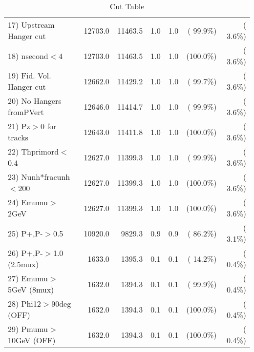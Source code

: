 \begin{table}[h!]
\begin{tabular}{||l||r|r|r|r|r|r||}
 17) Upstream Hanger cut  &      12703.0 &      11463.5 &          1.0 &          1.0 & ( 99.9\%) & (  3.6\%) \\
 18) nsecond$<$4          &      12703.0 &      11463.5 &          1.0 &          1.0 & (100.0\%) & (  3.6\%) \\
 19) Fid. Vol. Hanger cut &      12662.0 &      11429.2 &          1.0 &          1.0 & ( 99.7\%) & (  3.6\%) \\
 20) No Hangers fromPVert &      12646.0 &      11414.7 &          1.0 &          1.0 & ( 99.9\%) & (  3.6\%) \\
 21) Pz$>$0 for tracks    &      12643.0 &      11411.8 &          1.0 &          1.0 & (100.0\%) & (  3.6\%) \\
 22) Thprimord$<$0.4      &      12627.0 &      11399.3 &          1.0 &          1.0 & ( 99.9\%) & (  3.6\%) \\
 23) Nunh*fracunh$<$200   &      12627.0 &      11399.3 &          1.0 &          1.0 & (100.0\%) & (  3.6\%) \\
 24) Emumu$>$2GeV         &      12627.0 &      11399.3 &          1.0 &          1.0 & (100.0\%) & (  3.6\%) \\
 25) P+,P-$>$0.5          &      10920.0 &       9829.3 &          0.9 &          0.9 & ( 86.2\%) & (  3.1\%) \\
 26) P+,P-$>$1.0 (2.5mux) &       1633.0 &       1395.3 &          0.1 &          0.1 & ( 14.2\%) & (  0.4\%) \\
 27) Emumu$>$5GeV  (8mux) &       1632.0 &       1394.3 &          0.1 &          0.1 & ( 99.9\%) & (  0.4\%) \\
 28) Phi12$>$90deg  (OFF) &       1632.0 &       1394.3 &          0.1 &          0.1 & (100.0\%) & (  0.4\%) \\
 29) Pmumu$>$10GeV  (OFF) &       1632.0 &       1394.3 &          0.1 &          0.1 & (100.0\%) & (  0.4\%) \\
 \hline
 \hline
 \end{tabular}
 \caption{Cut Table           }
 \label{tab-cutcohjpsi-mumu_jpsi}
 \end{table}

